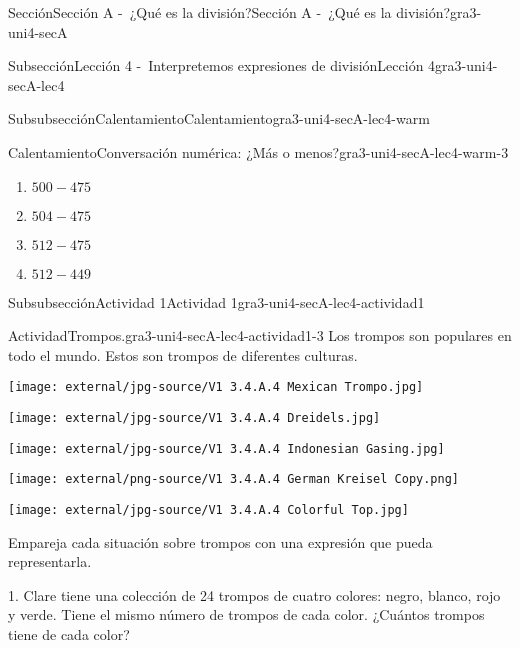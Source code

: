 \documentclass[twoside,10pt,]{article}
\begin{document}
\begin{sectionptx}{Sección}{Sección A -~¿Qué es la división?}{}{Sección A -~¿Qué es la división?}{}{}{gra3-uni4-secA}
\begin{subsectionptx}{Subsección}{Lección 4 -~Interpretemos expresiones de división}{}{Lección 4}{}{}{gra3-uni4-secA-lec4}
\begin{subsubsectionptx}{Subsubsección}{Calentamiento}{}{Calentamiento}{}{}{gra3-uni4-secA-lec4-warm}
\begin{exploration}{Calentamiento}{Conversación numérica: ¿Más o menos?}{gra3-uni4-secA-lec4-warm-3}
%
\begin{enumerate}
\item{}\(\displaystyle 500 - 475\)%
\item{}\(\displaystyle 504 - 475\)%
\item{}\(\displaystyle 512 - 475\)%
\item{}\(\displaystyle 512 - 449\)%
\end{enumerate}
%
\end{exploration}%
\end{subsubsectionptx}
%
%
\typeout{************************************************}
\typeout{************************************************}
%
\begin{subsubsectionptx}{Subsubsección}{Actividad 1}{}{Actividad 1}{}{}{gra3-uni4-secA-lec4-actividad1}
\begin{activity}{Actividad}{Trompos.}{gra3-uni4-secA-lec4-actividad1-3}%
Los trompos son populares en todo el mundo. Estos son trompos de diferentes culturas.%
\begin{sidebyside}{5}{0}{0}{0}%
\begin{sbspanel}{0.2}%
\texttt{[image: external/jpg-source/V1 3.4.A.4 Mexican Trompo.jpg]}
\end{sbspanel}%
\begin{sbspanel}{0.2}%
\texttt{[image: external/jpg-source/V1 3.4.A.4 Dreidels.jpg]}
\end{sbspanel}%
\begin{sbspanel}{0.2}%
\texttt{[image: external/jpg-source/V1 3.4.A.4 Indonesian Gasing.jpg]}
\end{sbspanel}%
\begin{sbspanel}{0.2}%
\texttt{[image: external/png-source/V1 3.4.A.4 German Kreisel Copy.png]}
\end{sbspanel}%
\begin{sbspanel}{0.2}%
\texttt{[image: external/jpg-source/V1 3.4.A.4 Colorful Top.jpg]}
\end{sbspanel}%
\end{sidebyside}%
\par
Empareja cada situación sobre trompos con una expresión que pueda representarla.%
\begin{sidebyside}{2}{0.05}{0}{0.15}%
\begin{sbspanel}{0.6}%
1. Clare tiene una colección de 24 trompos de cuatro colores: negro, blanco, rojo y verde. Tiene el mismo número de trompos de cada color. ¿Cuántos trompos tiene de cada color?%

\end{sbspanel}
\end{sidebyside}
\end{activity}
\end{subsubsectionptx}
\end{subsectionptx}
\end{sectionptx}
\end{document}
